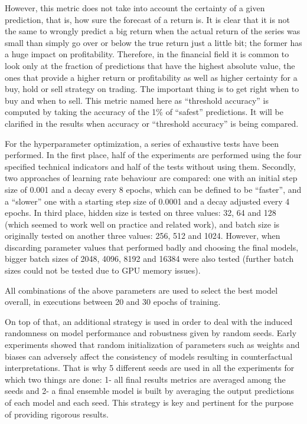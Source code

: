 \documentclass[10pt,twocolumn,letterpaper]{article}
\begin{document}
However, this metric does not take into account the certainty of a given prediction, that is, how sure the forecast of a return is. It is clear that it is not the same to wrongly predict a big return when the actual return of the series was small than simply go over or below the true return just a little bit; the former has a huge impact on profitability. Therefore, in the financial field it is common to look only at the fraction of predictions that have the highest absolute value, \ie the ones that provide a higher return or profitability as well as higher certainty for a buy, hold or sell strategy on trading. The important thing is to get right when to buy and when to sell. This metric named here as “threshold accuracy” is computed by taking the accuracy of the 1\% of “safest” predictions. It will be clarified in the results when accuracy or “threshold accuracy” is being compared.

For the hyperparameter optimization, a series of exhaustive tests have been performed. In the first place, half of the experiments are performed using the four specified technical indicators and half of the tests without using them. Secondly, two approaches of learning rate behaviour are compared: one with an initial step size of 0.001 and a decay every 8 epochs, which can be defined to be “faster”, and a “slower” one with a starting step size of 0.0001 and a decay adjusted every 4 epochs. In third place, hidden size is tested on three values: 32, 64 and 128 (which seemed to work well on practice and related work), and batch size is originally tested on another three values: 256, 512 and 1024. However, when discarding parameter values that performed badly and choosing the final models, bigger batch sizes of 2048, 4096, 8192 and 16384 were also tested (further batch sizes could not be tested due to GPU memory issues).

All combinations of the above parameters are used to select the best model overall, in executions between 20 and 30 epochs of training.

On top of that, an additional strategy is used in order to deal with the induced randomness on model performance and robustness given by random seeds. Early experiments showed that random initialization of parameters such as weights and biases can adversely affect the consistency of models resulting in counterfactual interpretations. That is why 5 different seeds are used in all the experiments for which two things are done: 1- all final results metrics are averaged among the seeds and 2- a final ensemble model is built by averaging the output predictions of each model and each seed. This strategy is key and pertinent for the purpose of providing rigorous results.
\end{document}
